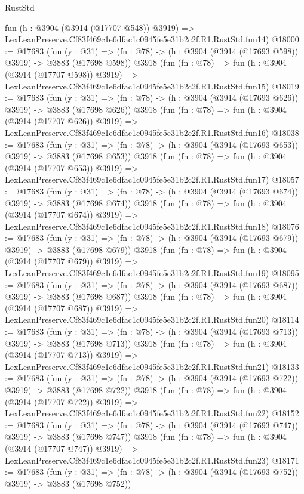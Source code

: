 \begin{lexlean}{RustStd}
\begin{coremodule}
    fun (h : @3904 (@3914 (@17707 @548)) @3919) =>
    LexLeanPreserve.Cf83f469c1e6dfac1c0945fe5e31b2c2f.R1.RustStd.fun14)
@18000 := @17683
    (fun (y : @31) => (fn : @78) -> (h : @3904 (@3914 (@17693 @598)) @3919) -> @3883 (@17698 @598))
    @3918
    (fun (fn : @78) =>
    fun (h : @3904 (@3914 (@17707 @598)) @3919) =>
    LexLeanPreserve.Cf83f469c1e6dfac1c0945fe5e31b2c2f.R1.RustStd.fun15)
@18019 := @17683
    (fun (y : @31) => (fn : @78) -> (h : @3904 (@3914 (@17693 @626)) @3919) -> @3883 (@17698 @626))
    @3918
    (fun (fn : @78) =>
    fun (h : @3904 (@3914 (@17707 @626)) @3919) =>
    LexLeanPreserve.Cf83f469c1e6dfac1c0945fe5e31b2c2f.R1.RustStd.fun16)
@18038 := @17683
    (fun (y : @31) => (fn : @78) -> (h : @3904 (@3914 (@17693 @653)) @3919) -> @3883 (@17698 @653))
    @3918
    (fun (fn : @78) =>
    fun (h : @3904 (@3914 (@17707 @653)) @3919) =>
    LexLeanPreserve.Cf83f469c1e6dfac1c0945fe5e31b2c2f.R1.RustStd.fun17)
@18057 := @17683
    (fun (y : @31) => (fn : @78) -> (h : @3904 (@3914 (@17693 @674)) @3919) -> @3883 (@17698 @674))
    @3918
    (fun (fn : @78) =>
    fun (h : @3904 (@3914 (@17707 @674)) @3919) =>
    LexLeanPreserve.Cf83f469c1e6dfac1c0945fe5e31b2c2f.R1.RustStd.fun18)
@18076 := @17683
    (fun (y : @31) => (fn : @78) -> (h : @3904 (@3914 (@17693 @679)) @3919) -> @3883 (@17698 @679))
    @3918
    (fun (fn : @78) =>
    fun (h : @3904 (@3914 (@17707 @679)) @3919) =>
    LexLeanPreserve.Cf83f469c1e6dfac1c0945fe5e31b2c2f.R1.RustStd.fun19)
@18095 := @17683
    (fun (y : @31) => (fn : @78) -> (h : @3904 (@3914 (@17693 @687)) @3919) -> @3883 (@17698 @687))
    @3918
    (fun (fn : @78) =>
    fun (h : @3904 (@3914 (@17707 @687)) @3919) =>
    LexLeanPreserve.Cf83f469c1e6dfac1c0945fe5e31b2c2f.R1.RustStd.fun20)
@18114 := @17683
    (fun (y : @31) => (fn : @78) -> (h : @3904 (@3914 (@17693 @713)) @3919) -> @3883 (@17698 @713))
    @3918
    (fun (fn : @78) =>
    fun (h : @3904 (@3914 (@17707 @713)) @3919) =>
    LexLeanPreserve.Cf83f469c1e6dfac1c0945fe5e31b2c2f.R1.RustStd.fun21)
@18133 := @17683
    (fun (y : @31) => (fn : @78) -> (h : @3904 (@3914 (@17693 @722)) @3919) -> @3883 (@17698 @722))
    @3918
    (fun (fn : @78) =>
    fun (h : @3904 (@3914 (@17707 @722)) @3919) =>
    LexLeanPreserve.Cf83f469c1e6dfac1c0945fe5e31b2c2f.R1.RustStd.fun22)
@18152 := @17683
    (fun (y : @31) => (fn : @78) -> (h : @3904 (@3914 (@17693 @747)) @3919) -> @3883 (@17698 @747))
    @3918
    (fun (fn : @78) =>
    fun (h : @3904 (@3914 (@17707 @747)) @3919) =>
    LexLeanPreserve.Cf83f469c1e6dfac1c0945fe5e31b2c2f.R1.RustStd.fun23)
@18171 := @17683
    (fun (y : @31) => (fn : @78) -> (h : @3904 (@3914 (@17693 @752)) @3919) -> @3883 (@17698 @752))

\end{coremodule}
\end{lexlean}
